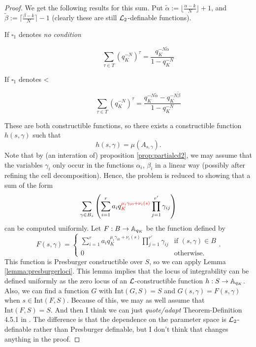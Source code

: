 \begin{proof}
We get the following results for this sum. 
Put $\tilde{\alpha}:= \lfloor\frac{\alpha -k}{N}\rfloor+1$, and $\tilde{\beta}:= \lceil\frac{\beta -k}{N}\rceil-1$ (clearly these are still $\Lm_2$-definable functions). 

\begin{description}
\item[If $\square_{1}$ denotes \emph{no condition}]
\[\sum_{\tau \in T} (q_K^{-N})^\tau = \frac{q_K^{-N\tilde{\alpha}}}{1-q_K^{-N}} \]
\item[If $\square_{1}$ denotes <]
\[\sum_{\tau \in T} (q_K^{-N})^\tau = \frac{q_K^{-N\tilde{\alpha}}-q_K^{-N\tilde{\beta}}}{1-q_K^{-N}} \]
\end{description}
These are both constructible functions, so there exists a constructible function $h(s,\gamma)$ such that \[h(s,\gamma) = \mu(A_{s, \gamma}).\]
Note that by (an interation of) proposition \ref{prop:partialcd2}, we may assume that the variables $\gamma_i$ only occur in the functions $\alpha_i$, $\beta_i$ in a {\color{red} linear} way (possibly after refining the cell decomposition). Hence, the problem is reduced to showing that a sum of the form 
\[\sum_{\gamma \in B_s} \left(\sum_{i=1}^r a_i q_K^{\color{red}\mu_i\gamma_{i0} + \nu_i(s)} \prod_{j=1}^{r'}\gamma_{ij}\right)\]
can be computed uniformly.
Let $F: B\to \AA_{q_K}$ be the function defined by
\[F(s,\gamma) = \left\{\begin{array}{ll}{\sum_{i=1}^r a_i q_K^{\mu_i\gamma_{i0} + \nu_i(s)} \prod_{j=1}^{r'}\gamma_{ij}} & \text{if } (s,\gamma)\in B\\ 0 & \text{otherwise}.
\end{array}.\right.\]
This function is Presburger constructible over $S$, so we can apply
Lemma \ref{lemma:presburgerloci}. This lemma implies that the locus of integrability can be defined uniformly as the zero locus of an $\Lm$-constructible function $h: S\to \AA_{q_K}$. Also, we can find a function $G$ with $\text{Int}(G,S)= S$ and $G(s,\gamma) = F(s,\gamma)$ when $s \in \text{Int}(F,S)$. Because of this, we may as well assume that $\text{Int}(F,S)=S$.
{\color{red} And then I think we can just \emph{quote/adapt} Theorem-Definition 4.5.1 in \cite{clu-loe-08}. The difference is that the dependence on the parameter space is $\Lm_2$-definable rather than Presburger definable, but I don't think that changes anything in the proof.}
\end{proof}

